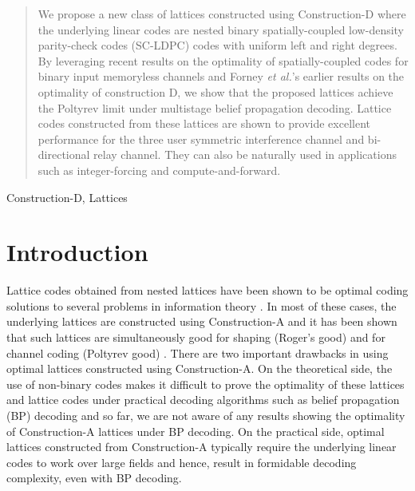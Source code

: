 \documentclass[journal,draftcls,onecolumn,12pt,twoside]{IEEEtran}
\begin{document}


\maketitle


\begin{abstract}
We propose a new class of lattices constructed using Construction-D where the underlying linear codes are nested binary spatially-coupled low-density parity-check codes (SC-LDPC) codes with uniform left and right degrees. By leveraging recent results on the optimality of spatially-coupled codes for binary input memoryless channels and Forney {\em et al.}'s earlier results on the optimality of construction D, we show that the proposed lattices achieve the Poltyrev limit under multistage belief propagation decoding. Lattice codes constructed from these lattices are shown to provide excellent performance for the three user symmetric interference channel and bi-directional relay channel. They can also be naturally used in applications such as integer-forcing and compute-and-forward.
\end{abstract}


\begin{IEEEkeywords}
Construction-D, Lattices
\end{IEEEkeywords}

\section{Introduction}
Lattice codes obtained from nested lattices have been shown to be optimal coding solutions to several problems in information theory \cite{erez05}. In most of these cases, the underlying lattices are constructed using Construction-A and it has been shown that such lattices are simultaneously good for shaping (Roger's good) and for channel coding (Poltyrev good) \cite{erez05}. There are two important drawbacks in using optimal lattices constructed using Construction-A. On the theoretical side, the use of non-binary codes makes it difficult to prove the optimality of these lattices and lattice codes under practical decoding algorithms such as belief propagation (BP) decoding and so far, we are not aware of any results showing the optimality of Construction-A lattices under BP decoding. On the practical side, optimal lattices constructed from Construction-A typically require the underlying linear codes to work over large fields and hence, result in formidable decoding complexity, even with BP decoding.
\end{document}
